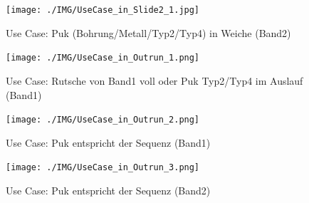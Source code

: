 \documentclass[
   draft=false
  ,paper=a4
  ,twoside=true
  ,fontsize=11pt
  ,headsepline
  ,DIV11
  ,parskip=full+
]{scrartcl} %
\begin{document}
\begin{figure}[H]
\begin{addmargin*}[0cm]{-0.16\textwidth}
	\label{fig:uc3slide}
  	\centering
    \texttt{[image: ./IMG/UseCase\_in\_Slide2\_1.jpg]}
    \caption[short Name]{Use Case: Puk (Bohrung/Metall/Typ2/Typ4) in Weiche (Band2)}
\end{addmargin*}
\end{figure}

\begin{figure}[H]
\begin{addmargin*}[-2.3cm]{-0.1\textwidth}
	\label{fig:uc3slide}
  	\centering
    \texttt{[image: ./IMG/UseCase\_in\_Outrun\_1.png]}
    \caption[short Name]{Use Case: Rutsche von Band1 voll oder Puk Typ2/Typ4 im Auslauf (Band1)}
\end{addmargin*}
\end{figure}

\begin{figure}[H]
\begin{addmargin*}[-2.3cm]{-0.15\textwidth}
	\label{fig:uc3slide}
  	\centering
    \texttt{[image: ./IMG/UseCase\_in\_Outrun\_2.png]}
    \caption[short Name]{Use Case: Puk entspricht der Sequenz (Band1)}
\end{addmargin*}
\end{figure}

\begin{figure}[H]
\begin{addmargin*}[-2.2cm]{-0.1\textwidth}
	\label{fig:uc3slide}
  	\centering
    \texttt{[image: ./IMG/UseCase\_in\_Outrun\_3.png]}
    \caption[short Name]{Use Case: Puk entspricht der Sequenz (Band2)}
\end{addmargin*}
\end{figure}

\end{document}
